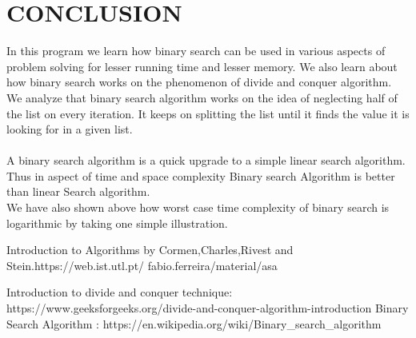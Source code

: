\documentclass[conference]{IEEEtran}
\begin{document}
\section{CONCLUSION}
In this program we learn how binary search can be used in various aspects of problem solving for lesser running time and lesser memory. We also learn about how binary search works on the phenomenon of divide and conquer algorithm.
We analyze that binary search algorithm works on the idea of neglecting half of the list on every iteration. It keeps on splitting the list until it finds the value it is looking
for in a given list. \\ \\
A binary search algorithm is a quick upgrade to a simple linear search algorithm.\\
Thus in aspect of time and space complexity Binary search Algorithm is better than linear Search algorithm. \\
We have also shown above how worst case time complexity of binary search is logarithmic by taking one simple
illustration.




\begin{thebibliography}{00}

 Introduction to Algorithms by Cormen,Charles,Rivest and Stein.https://web.ist.utl.pt/ fabio.ferreira/material/asa

 Introduction to divide and conquer technique: https://www.geeksforgeeks.org/divide-and-conquer-algorithm-introduction
 Binary Search Algorithm :    https://en.wikipedia.org/wiki/Binary_search_algorithm
\end{thebibliography}
\vspace{12pt}
\end{document}
